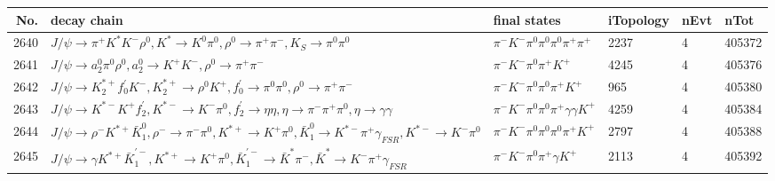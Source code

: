 \begin{table}[htbp] 
\begin{center}
\begin{small}
\begin{tabular}{rlllll}\hline\hline
 No. & decay chain & final states &  iTopology & nEvt & nTot \\\hline
2640&$J/\psi       \rightarrow \pi^{+}        K^{*}          K^{-}          \rho^{0}      , K^{*}           \rightarrow K^{0}          \pi^{0}        , \rho^{0}       \rightarrow \pi^{+}        \pi^{-}        , K_{S}           \rightarrow \pi^{0}        \pi^{0}        $&$\pi^{-}        K^{-}          \pi^{0}        \pi^{0}        \pi^{0}        \pi^{+}        \pi^{+}        $& 2237&    4&405372\\
2641&$J/\psi       \rightarrow a_{2}^{0}      \pi^{0}        \rho^{0}      , a_{2}^{0}       \rightarrow K^{+}          K^{-}          , \rho^{0}       \rightarrow \pi^{+}        \pi^{-}        $&$\pi^{-}        K^{-}          \pi^{0}        \pi^{+}        K^{+}          $& 4245&    4&405376\\
2642&$J/\psi       \rightarrow K_2^{*+}       f^{'}_{0}     K^{-}          , K_2^{*+}        \rightarrow \rho^{0}      K^{+}          , f^{'}_{0}      \rightarrow \pi^{0}        \pi^{0}        , \rho^{0}       \rightarrow \pi^{+}        \pi^{-}        $&$\pi^{-}        K^{-}          \pi^{0}        \pi^{0}        \pi^{+}        K^{+}          $&  965&    4&405380\\
2643&$J/\psi       \rightarrow K^{*-}         K^{+}          f_2^{'}       , K^{*-}          \rightarrow K^{-}          \pi^{0}        , f_2^{'}        \rightarrow \eta          \eta          , \eta           \rightarrow \pi^{-}        \pi^{+}        \pi^{0}        , \eta           \rightarrow \gamma       \gamma       $&$\pi^{-}        K^{-}          \pi^{0}        \pi^{0}        \pi^{+}        \gamma       \gamma       K^{+}          $& 4259&    4&405384\\
2644&$J/\psi       \rightarrow \rho^{-}      K^{*+}         \bar{K}_1^{0} , \rho^{-}       \rightarrow \pi^{-}        \pi^{0}        , K^{*+}          \rightarrow K^{+}          \pi^{0}        , \bar{K}_1^{0}  \rightarrow K^{*-}         \pi^{+}        \gamma_{FSR} , K^{*-}          \rightarrow K^{-}          \pi^{0}        $&$\pi^{-}        K^{-}          \pi^{0}        \pi^{0}        \pi^{0}        \pi^{+}        K^{+}          $& 2797&    4&405388\\
2645&$J/\psi       \rightarrow \gamma       K^{*+}         \bar{K}_1^{'-}, K^{*+}          \rightarrow K^{+}          \pi^{0}        , \bar{K}_1^{'-} \rightarrow \bar{K}^{*}   \pi^{-}        , \bar{K}^{*}    \rightarrow K^{-}          \pi^{+}        \gamma_{FSR} $&$\pi^{-}        K^{-}          \pi^{0}        \pi^{+}        \gamma       K^{+}          $& 2113&    4&405392\\

\end{tabular}
\end{small}
\end{center}
\end{table}
